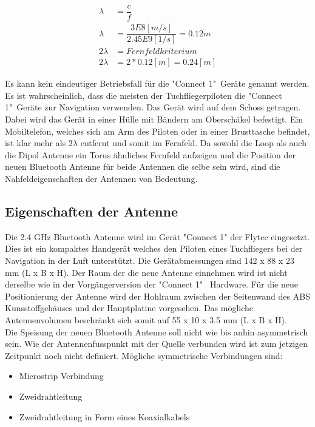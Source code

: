 \begin{align}\label{eq:Fernfeld}
\lambda &=\dfrac{c}{f} \\
\lambda &=\dfrac{3E8[m/s]}{2.45E9[1/s]}=0.12m\\ \nonumber
2\lambda &= Fernfeldkriterium\\ \nonumber
2\lambda &= 2*0.12[m] =0.24[m] \nonumber
\end{align}

Es kann kein eindeutiger Betriebsfall für die "Connect 1"\  Geräte genannt werden. Es ist wahrscheinlich, dass die meisten der Tuchfliegerpiloten die "Connect 1"\  Geräte zur Navigation verwenden. Das Gerät wird auf dem Schoss getragen. Dabei wird das Gerät in einer Hülle mit Bändern am Oberschäkel befestigt. Ein Mobiltelefon, welches sich am Arm des Piloten oder in einer Brusttasche befindet, ist klar mehr als $2\lambda$ entfernt und somit im Fernfeld. Da sowohl die Loop als auch die Dipol Antenne ein Torus ähnliches Fernfeld aufzeigen und die Position der neuen Bluetooth Antenne für beide Antennen die selbe sein wird, sind die Nahfeldeigenschaften der Antennen von Bedeutung.

\subsection{Eigenschaften der Antenne}\label{sec:EigenschaftenAntenne}
Die 2.4 GHz Bluetooth Antenne wird im Gerät "Connect 1" der Flytec eingesetzt. Dies ist ein kompaktes Handgerät welches den Piloten eines Tuchfliegers bei der Navigation in der Luft unterstützt. Die Gerätabmessungen sind 142 x 88 x 23 mm (L x B x H). Der Raum der die neue Antenne einnehmen wird ist nicht derselbe wie in der Vorgängerversion der "Connect 1" \ Hardware. Für die neue Positionierung der Antenne wird der Hohlraum zwischen der Seitenwand des ABS Kunsstoffgehäuses und der Hauptplatine  vorgesehen. Das mögliche Antennenvolumen beschränkt sich somit auf 55 x 10 x 3.5 mm (L x B x H).\\
Die Speisung der neuen Bluetooth Antenne soll nicht wie bis anhin asymmetrisch sein. Wie der Antennenfusspunkt mit der Quelle verbunden wird ist zum jetzigen Zeitpunkt noch nicht definiert. Mögliche symmetrische Verbindungen sind:

\begin{itemize}
\item Microstrip Verbindung  
\item Zweidrahtleitung
\item Zweidrahtleitung in Form eines Koaxialkabels
\end{itemize}

